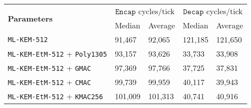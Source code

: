 \documentclass[runningheads]{llncs}
\newcommand{\keygen}{\texttt{KeyGen}}
\newcommand{\encap}{\texttt{Encap}}
\newcommand{\decap}{\texttt{Decap}}
\newcommand{\pk}{\texttt{pk}}
\newcommand{\sk}{\texttt{sk}}
\begin{document}
\begin{table}[h]
    \centering
    \footnotesize

    \begin{tabular}[t]{|p{15em}|p{5em}|p{5em}|p{5em}|p{5em}|}
        \hline
        \multirow{2}{*}{\bf Parameters} 
        & \multicolumn{2}{|c|}{$\encap$ cycles/tick} 
        & \multicolumn{2}{|c|}{$\decap$ cycles/tick} \\
        \cline{2-5}
        & Median & Average & Median & Average \\
        \hline
        \texttt{ML-KEM-512} & 91,467 & 92,065 & 121,185 & 121,650 \\
        \hline
        \texttt{ML-KEM-EtM-512} + \texttt{Poly1305} & 93,157 & 93,626 & 33,733 & 33,908 \\
        \hline
        \texttt{ML-KEM-EtM-512} + \texttt{GMAC} & 97,369 & 97,766 & 37,725 & 37,831 \\
        \hline
        \texttt{ML-KEM-EtM-512} + \texttt{CMAC} & 99,739 & 99,959 & 40,117 & 39,943 \\
        \hline
        \texttt{ML-KEM-EtM-512} + \texttt{KMAC256} & 101,009 & 101,313 & 40,741 & 40,916 \\
        \hline
    \end{tabular}\vspace{0.3cm}


\end{table}
\end{document}
